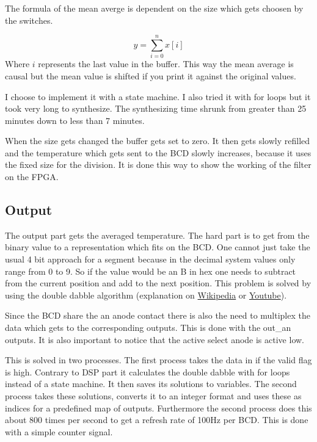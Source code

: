 The formula of the mean averge is dependent on the size which gets choosen by the switches.

\begin{equation}
y = \sum_{i=0}^n x[i]
\end{equation}
Where $i$ represents the last value in the buffer. This way the mean average is causal but the mean
value is shifted if you print it against the original values.

I choose to implement it with a state machine. I also tried it with for loops but it took very
long to synthesize. The synthesizing time shrunk from greater than
25 minutes down to less than 7 minutes.

When the size gets changed the buffer gets set to zero. It then gets slowly refilled and the temperature
which gets sent to the BCD slowly increases, because it uses the fixed size for the division. 
It is done this way to show the working of the filter on the FPGA.

\subsection{Output}
The output part gets the averaged temperature. The hard part is to get from the binary value to a 
representation which fits on the BCD. One cannot just take the usual 4 bit approach for a segment 
because in the decimal system values only range from 0 to 9. So if the value would be an B in hex
one needs to subtract from the current position and add to the next position. This problem is solved
by using the double dabble algorithm (explanation on \href{https://en.wikipedia.org/wiki/Double_dabble}{Wikipedia} or \href{https://www.youtube.com/watch?v=eXIfZ1yKFlA}{Youtube}).

Since the BCD share the an anode contact there is also the need to multiplex the data which gets
to the corresponding outputs. This is done with the out_an outputs. It is also important to notice
that the active select anode is active low.

This is solved in two processes. The first process takes the data in if the valid flag is high. Contrary to 
DSP part it calculates the double dabble with for loops instead of a state machine. It then saves its
solutions to variables. The second process takes these solutions, converts it to an integer format and
uses these as indices for a predefined map of outputs. Furthermore the second process does this about
800 times per second to get a refresh rate of 100Hz per BCD. This is done with a simple counter signal.


